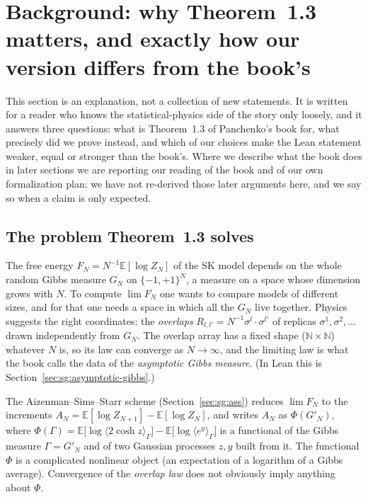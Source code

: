 \section{Background: why Theorem~1.3 matters, and exactly how our version differs from the book's}\label{sec:sg:gram-background}

This section is an explanation, not a collection of new statements. It is written for a reader who knows the statistical-physics side of the story only loosely, and it answers three questions:
what is Theorem~1.3 of Panchenko's book for, what precisely did we prove instead, and which of our choices make the Lean statement weaker, equal or stronger than the book's. Where we describe what the book
does in later sections we are reporting our reading of the book and of our own formalization plan; we have not re-derived those later arguments here, and we say so when a claim is only expected.

\subsection*{The problem Theorem~1.3 solves}

The free energy $F_N=N^{-1}\mathbb E[\log Z_N]$ of the SK model depends on the whole random Gibbs measure $G_N$ on $\{-1,+1\}^N$, a measure on a space whose dimension grows with $N$.
To compute $\lim F_N$ one wants to compare models of different sizes, and for that one needs a space in which all the $G_N$ live together. Physics suggests the right coordinates: the \emph{overlaps}
$R_{l,l'}=N^{-1}\sigma^l\cdot\sigma^{l'}$ of replicas $\sigma^1,\sigma^2,\dots$ drawn independently from $G_N$. The overlap array has a fixed shape ($\mathbb N\times\mathbb N$) whatever $N$ is, so
its law can converge as $N\to\infty$, and the limiting law is what the book calls the data of the \emph{asymptotic Gibbs measure}. (In Lean this is Section~\ref{sec:sg:asymptotic-gibbs}.)

The Aizenman--Sims--Starr scheme (Section~\ref{sec:sg:ass}) reduces $\lim F_N$ to the increments $A_N=\mathbb E[\log Z_{N+1}]-\mathbb E[\log Z_N]$, and writes $A_N$ as
$\Phi(G'_N)$, where $\Phi(\Gamma)=\mathbb E\big[\log\langle2\cosh z\rangle_\Gamma\big]-\mathbb E\big[\log\langle e^{y}\rangle_\Gamma\big]$ is a functional of the Gibbs measure $\Gamma=G'_N$ and of two Gaussian processes $z,y$ built from it.
The functional $\Phi$ is a complicated nonlinear object (an expectation of a logarithm of a Gibbs average). Convergence of the \emph{overlap law} does not obviously imply anything about $\Phi$.

